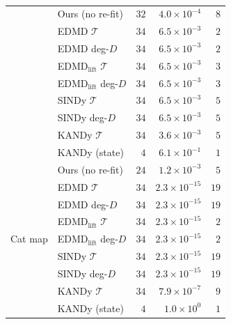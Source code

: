 \begin{table}[ht]
{\begin{tabular}{@{}llrrr@{}}
 & Ours (no re-fit) & $32$ & $4.0\times10^{-4}$ & $8$ \\
 & EDMD $\mathcal{T}$ & $34$ & $6.5\times10^{-3}$ & $2$ \\
 & EDMD deg-$D$ & $34$ & $6.5\times10^{-3}$ & $2$ \\
 & EDMD$_{\mathrm{lift}}$ $\mathcal{T}$ & $34$ & $6.5\times10^{-3}$ & $3$ \\
 & EDMD$_{\mathrm{lift}}$ deg-$D$ & $34$ & $6.5\times10^{-3}$ & $3$ \\
 & SINDy $\mathcal{T}$ & $34$ & $6.5\times10^{-3}$ & $5$ \\
 & SINDy deg-$D$ & $34$ & $6.5\times10^{-3}$ & $5$ \\
 & KANDy $\mathcal{T}$ & $34$ & $3.6\times10^{-3}$ & $5$ \\
 & KANDy (state) & $4$ & $6.1\times10^{-1}$ & $1$ \\
\midrule
\multirow{9}{*}{Cat map}
 & Ours (no re-fit) & $24$ & $1.2\times10^{-3}$ & $5$ \\
 & EDMD $\mathcal{T}$ & $34$ & $2.3\times10^{-15}$ & $19$ \\
 & EDMD deg-$D$ & $34$ & $2.3\times10^{-15}$ & $19$ \\
 & EDMD$_{\mathrm{lift}}$ $\mathcal{T}$ & $34$ & $2.3\times10^{-15}$ & $2$ \\
 & EDMD$_{\mathrm{lift}}$ deg-$D$ & $34$ & $2.3\times10^{-15}$ & $2$ \\
 & SINDy $\mathcal{T}$ & $34$ & $2.3\times10^{-15}$ & $19$ \\
 & SINDy deg-$D$ & $34$ & $2.3\times10^{-15}$ & $19$ \\
 & KANDy $\mathcal{T}$ & $34$ & $7.9\times10^{-7}$ & $9$ \\
 & KANDy (state) & $4$ & $1.0\times10^{0}$ & $1$ \\
\bottomrule
\end{tabular}
\caption{}
\label{tab:dictionary-ablation}
}
\end{table}
